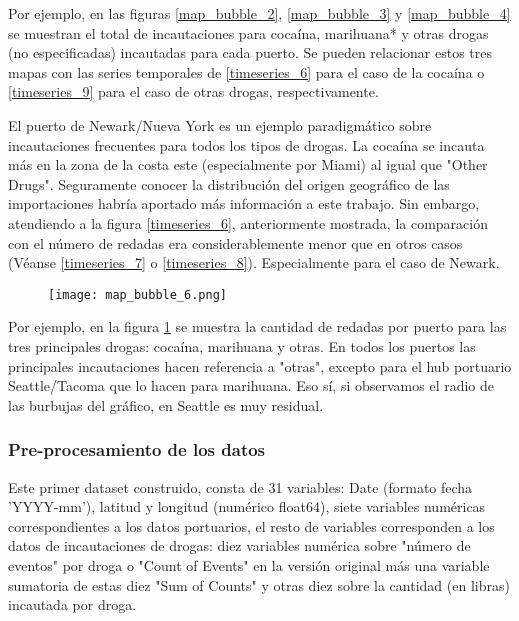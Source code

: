 \documentclass[12pt]{article}
\begin{document}
		Por ejemplo, en las figuras \ref{map_bubble_2}, \ref{map_bubble_3} y \ref{map_bubble_4} se muestran el total de incautaciones para cocaína, marihuana* y otras drogas (no especificadas) incautadas para cada puerto. Se pueden relacionar estos tres mapas con las series temporales de \ref{timeseries_6} para el caso de la cocaína o  \ref{timeseries_9} para el caso de otras drogas, respectivamente.
		
		El puerto de Newark/Nueva York es un ejemplo paradigmático sobre incautaciones frecuentes para todos los tipos de drogas. La cocaína se incauta más en la zona de la costa este (especialmente por Miami) al igual que "Other Drugs". Seguramente conocer la distribución del origen geográfico de las importaciones habría aportado más información a este trabajo. Sin embargo, atendiendo a la figura \ref{timeseries_6}, anteriormente mostrada, la comparación con el número de redadas era considerablemente menor que en otros casos (Véanse \ref{timeseries_7} o \ref{timeseries_8}). Especialmente para el caso de Newark.
		
		\begin{figure}[H]
			\caption{\label{map_bubble_6} }
			\centering
			\hspace*{1cm}
			\texttt{[image: map\_bubble\_6.png]}
		\end{figure}
		
		Por ejemplo, en la figura \ref{map_bubble_6} se muestra la cantidad de redadas por puerto para las tres principales drogas: cocaína, marihuana y otras. En todos los puertos las principales incautaciones hacen referencia a "otras", excepto para el hub portuario Seattle/Tacoma que lo hacen para marihuana. Eso sí, si observamos el radio de las burbujas del gráfico, en Seattle es muy residual.
		
		
		
		\subsubsection{\label{preprocessing}Pre-procesamiento de los datos}
		Este primer dataset construido, consta de 31 variables: Date (formato fecha 'YYYY-mm'), latitud y longitud (numérico float64), siete variables numéricas correspondientes a los datos portuarios, el resto de variables corresponden a los datos de incautaciones de drogas: diez variables numérica sobre "número de eventos" por droga o "Count of Events" en la versión original más una variable sumatoria de estas diez "Sum of Counts" y otras diez sobre la cantidad (en libras) incautada por droga.
		
\end{document}

